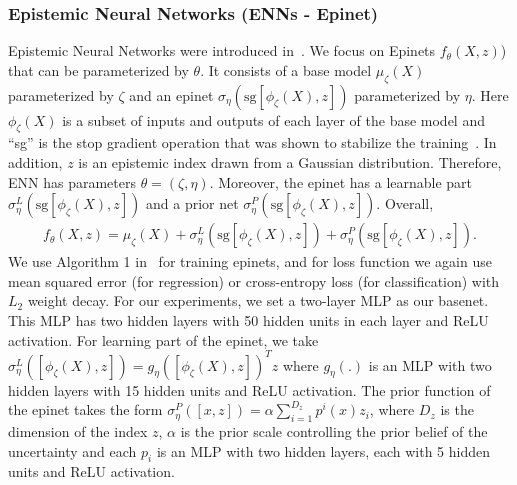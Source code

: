 



 \subsubsection{Epistemic Neural Networks (ENNs - Epinet)}

Epistemic Neural Networks were introduced in~\citep{OsbandWenAsDwIbLuRo23}. 
We focus on Epinets   $f_\theta(X,z)$) that can be parameterized by $\theta$. 
It consists of a base model $\mu_\zeta(X)$ parameterized by 
$\zeta$ and an epinet $\sigma_\eta(\mathrm{sg}[\phi_\zeta(X),z])$ parameterized by $\eta$. 
Here $\phi_\zeta(X)$ is a subset of inputs and outputs of each layer of the base model and ``sg'' is the stop gradient 
operation that was shown to stabilize the training~\citep{OsbandWenAsDwIbLuRo23}.
In addition, $z$ is an epistemic index drawn from a Gaussian distribution. 
Therefore, ENN has parameters $\theta=(\zeta,\eta)$. Moreover, the epinet has a learnable part 
$\sigma_\eta^L(\mathrm{sg}[\phi_\zeta(X),z])$ and a prior net $\sigma^P_\eta(\mathrm{sg}[\phi_\zeta(X),z])$.
Overall,
\begin{align*}
    f_\theta(X,z) = \mu_\zeta(X) + \sigma_\eta^L(\mathrm{sg}[\phi_\zeta(X),z]) + \sigma^P_\eta(\mathrm{sg}[\phi_\zeta(X),z]).
\end{align*}
We use Algorithm 1 in~\citep{OsbandWenAsDwIbLuRo23} for training epinets, and for loss function we  again use  mean squared error (for regression) or cross-entropy loss (for classification) with $L_2$ weight decay. For our experiments, we set a two-layer MLP as our basenet. This MLP has two hidden layers with 50 hidden units in each layer and ReLU activation. For learning part of the epinet,  we take $\sigma_\eta^L([\phi_\zeta(X),z]) = g_\eta([\phi_\zeta(X),z])^Tz$  where $g_\eta(.)$ is an MLP with two hidden layers with 15 hidden units and ReLU activation. The prior function of the epinet 
takes the form $\sigma^P_\eta([x,z]) = \alpha \sum_{i=1}^{D_z}p^i(x)z_i$, where $D_z$ is the dimension of the index $z$, $\alpha$ is the prior scale controlling the prior belief of the uncertainty and each $p_i$ is an MLP with two hidden layers, each with 5 hidden units and ReLU activation. 


